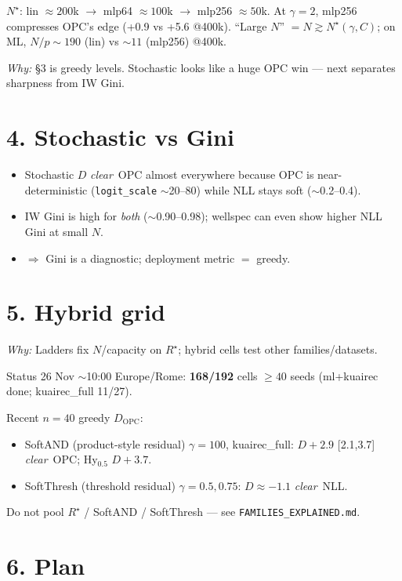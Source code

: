 \documentclass[11pt]{article}
\newcommand{\phonesection}[1]{\Needspace{7\baselineskip}\section*{#1}}
\newcommand{\why}[1]{\par{\footnotesize\color{blue!35!black}\textit{Why:} #1\par}}
\newcommand{\Rstar}{R^{\star}}
\newcommand{\clearwin}{\emph{clear}}
\begin{document}
\(N^\star\): lin \(\approx 200\)k \(\to\)
mlp64 \(\approx 100\)k \(\to\) mlp256 \(\approx 50\)k.
At \(\gamma{=}2\), mlp256 compresses OPC's edge
(+0.9 vs +5.6 @400k).
``Large \(N\)'' \(=N\gtrsim N^\star(\gamma,C)\);
on ML, \(N/p\sim 190\) (lin) vs \(\sim 11\)
(mlp256) @400k.

\why{§3 is greedy levels. Stochastic looks
like a huge OPC win --- next separates
sharpness from IW Gini.}

\phonesection{4. Stochastic vs Gini}

\begin{itemize}
  \item Stochastic \(D\) \clearwin\ OPC almost
        everywhere because OPC is near-
        deterministic (\texttt{logit\_scale}
        \(\sim\)20--80) while NLL stays soft
        (\(\sim\)0.2--0.4).
  \item IW Gini is high for \emph{both}
        (\(\sim\)0.90--0.98); wellspec can even
        show higher NLL Gini at small \(N\).
  \item \(\Rightarrow\) Gini is a diagnostic;
        deployment metric $=$ greedy.
\end{itemize}

\phonesection{5. Hybrid grid}

\why{Ladders fix \(N\)/capacity on \(\Rstar\);
hybrid cells test other families/datasets.}

Status 26 Nov \(\sim\)10:00 Europe/Rome:
\textbf{168/192} cells \(\ge 40\) seeds
(ml+kuairec done; kuairec\_full 11/27).

Recent \(n{=}40\) greedy \(D_{\mathrm{OPC}}\):
\begin{itemize}
  \item SoftAND (product-style residual)
        \(\gamma{=}100\), kuairec\_full:
        \(D{+}2.9\) [2.1,3.7] \clearwin\ OPC;
        Hy\(_{0.5}\) \(D{+}3.7\).
  \item SoftThresh (threshold residual)
        \(\gamma{=}0.5,0.75\):
        \(D\approx{-}1.1\) \clearwin\ NLL.
\end{itemize}
Do not pool \(\Rstar\) / SoftAND / SoftThresh
--- see \texttt{FAMILIES\_EXPLAINED.md}.

\phonesection{6. Plan}
\end{document}
